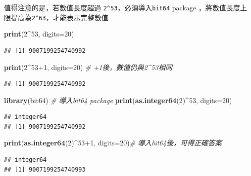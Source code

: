 \documentclass[]{book}
\newenvironment{Shaded}{\begin{snugshade}}{\end{snugshade}}
\newcommand{\KeywordTok}[1]{\textcolor[rgb]{0.13,0.29,0.53}{\textbf{{#1}}}}
\newcommand{\DataTypeTok}[1]{\textcolor[rgb]{0.13,0.29,0.53}{{#1}}}
\newcommand{\DecValTok}[1]{\textcolor[rgb]{0.00,0.00,0.81}{{#1}}}
\newcommand{\CommentTok}[1]{\textcolor[rgb]{0.56,0.35,0.01}{\textit{{#1}}}}
\newcommand{\NormalTok}[1]{{#1}}
\theoremstyle{definition}
\theoremstyle{definition}
\theoremstyle{remark}
\begin{document}
值得注意的是，若數值長度超過 \texttt{2\^{}53}，必須導入\texttt{bit64}
package
\citep{R-bit64}，將數值長度上限提高為\texttt{2\^{}63}，才能表示完整數值

\begin{Shaded}
\begin{Highlighting}[]
\KeywordTok{print}\NormalTok{(}\DecValTok{2}\NormalTok{^}\DecValTok{53}\NormalTok{, }\DataTypeTok{digits=}\DecValTok{20}\NormalTok{) }
\end{Highlighting}
\end{Shaded}

\begin{verbatim}
## [1] 9007199254740992
\end{verbatim}

\begin{Shaded}
\begin{Highlighting}[]
\KeywordTok{print}\NormalTok{(}\DecValTok{2}\NormalTok{^}\DecValTok{53+1}\NormalTok{, }\DataTypeTok{digits=}\DecValTok{20}\NormalTok{) }\CommentTok{# +1後，數值仍與2^53相同}
\end{Highlighting}
\end{Shaded}

\begin{verbatim}
## [1] 9007199254740992
\end{verbatim}

\begin{Shaded}
\begin{Highlighting}[]
\KeywordTok{library}\NormalTok{(bit64) }\CommentTok{# 導入bit64 package}
\KeywordTok{print}\NormalTok{(}\KeywordTok{as.integer64}\NormalTok{(}\DecValTok{2}\NormalTok{)^}\DecValTok{53}\NormalTok{, }\DataTypeTok{digits=}\DecValTok{20}\NormalTok{)}
\end{Highlighting}
\end{Shaded}

\begin{verbatim}
## integer64
## [1] 9007199254740992
\end{verbatim}

\begin{Shaded}
\begin{Highlighting}[]
\KeywordTok{print}\NormalTok{(}\KeywordTok{as.integer64}\NormalTok{(}\DecValTok{2}\NormalTok{)^}\DecValTok{53+1}\NormalTok{, }\DataTypeTok{digits=}\DecValTok{20}\NormalTok{)}\CommentTok{# 導入bit64後，可得正確答案}
\end{Highlighting}
\end{Shaded}

\begin{verbatim}
## integer64
## [1] 9007199254740993
\end{verbatim}
\end{document}
